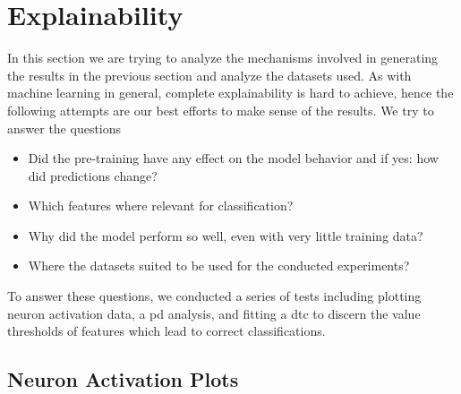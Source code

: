\clearpage







\FloatBarrier


\section{Explainability} \label{sec:results:explainability}

In this section we are trying to analyze the mechanisms involved in generating the results in the previous section and analyze the datasets used. As with machine learning in general, complete explainability is hard to achieve, hence the following attempts are our best efforts to make sense of the results. We try to answer the questions

\begin{itemize}
	\item Did the pre-training have any effect on the model behavior and if yes: how did predictions change?
	\item Which features where relevant for classification? 
	\item Why did the model perform so well, even with very little training data?
	\item Where the datasets suited to be used for the conducted experiments?
\end{itemize}

To answer these questions, we conducted a series of tests including plotting neuron activation data, a \gls{pd} analysis, and fitting a \gls{dtc} to discern the value thresholds of features which lead to correct classifications. 

\subsection{Neuron Activation Plots} \label{sec:results:explainability:nap}

